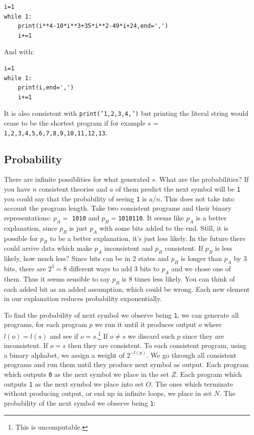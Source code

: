 \documentclass[oneside,hidelinks]{article}
\begin{document}
\begin{lstlisting}[caption={This gives us 29 as the next number}]
i=1
while 1:
	print(i**4-10*i**3+35*i**2-49*i+24,end=',')
	i+=1
\end{lstlisting}

And with:

\begin{lstlisting}[caption={This gives us 5 as the next number}]
i=1
while 1:
	print(i,end=',')
	i+=1
\end{lstlisting} %

It is also consistent with \texttt{print('1,2,3,4,')} but printing the literal string would cease to be the shortest program if for example $s$ = \texttt{1,2,3,4,5,6,7,8,9,10,11,12,13}.

\newpage

\subsection{Probability}

There are infinite possiblities for what generated $s$.
What are the probabilities?
If you have $n$ consistent theories and $a$ of them predict the next symbol will be \texttt{1} you could say that the probability of seeing \texttt{1} is $a/n$.
This does not take into account the program length.
Take two consistent programs and their binary representations: $p_A =$ \texttt{1010} and $p_B = $\texttt{1010110}.
It seems like $p_A$ is a better explanation, since $p_B$ is just $p_A$ with some bits added to the end.
Still, it is possible for $p_B$ to be a better explanation, it's just less likely.
In the future there could arrive data which make $p_A$ inconsistent and $p_B$ consistent.
If $p_B$ is less likely, how much less?
Since bits can be in 2 states and $p_B$ is longer than $p_A$ by 3 bits, there are $2^{3} = 8$ different ways to add 3 bits to $p_A$ and we chose one of them.
Thus it seems sensible to say $p_B$ is 8 times less likely.
You can think of each added bit as an added assumption, which could be wrong.
Each new element in our explanation reduces probability exponentially.

To find the probability of next symbol we observe being \texttt{1}, we can generate all programs, for each program $p$ we run it until it produces output $o$ where $l(o) = l(s)$ and see if $o = s$.\footnote{This is uncomputable.}
If $o \neq s$ we discard such $p$ since they are inconsistent.
If $o = s$ then they are consistent.
To each consistent program, using a binary alphabet, we assign a weight of $2^{-l(p)}$.
We go through all consistent programs and run them until they produce next symbol as output.
Each program which outputs \texttt{0} as the next symbol we place in the set $Z$.
Each program which outputs \texttt{1} as the next symbol we place into set $O$.
The ones which terminate without producing output, or end up in infinite loops, we place in set $N$.
The probability of the next symbol we observe being \texttt{1}:
\end{document}

